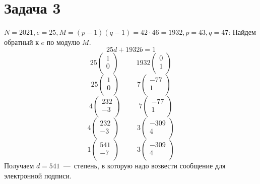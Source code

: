 \documentclass[a4paper,12pt]{article} %
\begin{document}
\section*{Задача 3}
$ N = 2021, e = 25, M =(p-1)(q-1)=42\cdot46=1932, p=43, q = 47$: Найдем обратный к $e$ по модулю $M$.
\[
25d+1932b = 1
\]
\[
25\begin{pmatrix}
1\\0\\
\end{pmatrix}\hspace{30pt}
1932\begin{pmatrix}
0\\1\\
\end{pmatrix}
\]
\[
25\begin{pmatrix}
1\\0\\
\end{pmatrix}\hspace{30pt}
7\begin{pmatrix}
-77\\1\\
\end{pmatrix}
\]
\[
4\begin{pmatrix}
232\\-3\\
\end{pmatrix}\hspace{30pt}
7\begin{pmatrix}
-77\\1\\
\end{pmatrix}
\]
\[
4\begin{pmatrix}
232\\-3\\
\end{pmatrix}\hspace{30pt}
3\begin{pmatrix}
-309\\4\\
\end{pmatrix}
\]
\[
1\begin{pmatrix}
541\\-7\\
\end{pmatrix}\hspace{30pt}
3\begin{pmatrix}
-309\\4\\
\end{pmatrix}
\]
Получаем $d=541$~---~степень, в которую надо возвести сообщение для электронной подписи.\\
\end{document}
